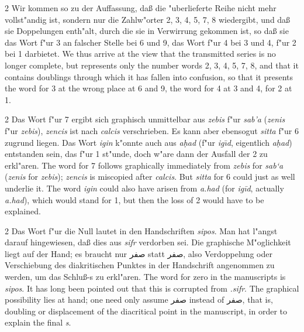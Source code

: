 \documentclass[10pt,a4paper]{article}
\renewcommand{\switchcolumn}{\syncronize\nointerlineskip\columnbreak}
\newcommand{\RL}[1]{\beginR#1\endR}
\newcommand{\ar}[1]{{\arabicfont\RL{#1}}}
\begin{document}
\begin{paracol}{2}
Wir kommen so zu der Auffassung, da\ss{} die "uberlieferte Reihe nicht mehr vollst"andig ist, sondern nur die Zahlw"orter 2, 3, 4, 5, 7, 8 wiedergibt, und da\ss{} sie Doppelungen enth"alt, durch die sie in Verwirrung gekommen ist, so da\ss{} sie das Wort f"ur 3 an falscher Stelle bei 6 und 9, das Wort f"ur 4 bei 3 und 4, f"ur 2 bei 1 darbietet.
\switchcolumn
We thus arrive at the view that the transmitted series is no longer complete, but represents only the number words 2, 3, 4, 5, 7, 8, and that it contains doublings through which it has fallen into confusion, so that it presents the word for 3 at the wrong place at 6 and 9, the word for 4 at 3 and 4, for 2 at 1.
\end{paracol}

\begin{paracol}{2}
Das Wort f"ur 7 ergibt sich graphisch unmittelbar aus \textit{zebis} f"ur \textit{sab'a} (\textit{zenis} f"ur \textit{zebis}), \textit{zencis} ist nach \textit{calcis} verschrieben. Es kann aber ebensogut \textit{sitta} f"ur 6 zugrund liegen. Das Wort \textit{igin} k"onnte auch aus \textit{a\d{h}ad} (f"ur \textit{ig\=ıd}, eigentlich \textit{a\d{h}ad}) entstanden sein, das f"ur 1 st"unde, doch w"are dann der Ausfall der 2 zu erkl"aren.
\switchcolumn
The word for 7 follows graphically immediately from \textit{zebis} for \textit{sab`a} (\textit{zenis} for \textit{zebis}); \textit{zencis} is miscopied after \textit{calcis}. But \textit{sitta} for 6 could just as well underlie it. The word \textit{igin} could also have arisen from \textit{a.had} (for \textit{ig\={i}d}, actually \textit{a.had}), which would stand for 1, but then the loss of 2 would have to be explained.
\end{paracol}

\begin{paracol}{2}
Das Wort f"ur die Null lautet in den Handschriften \textit{sipos}. Man hat l"angst darauf hingewiesen, da\ss{} dies aus \textit{sifr} verdorben sei. Die graphische M"oglichkeit liegt auf der Hand; es braucht nur \ar{صفر} statt \ar{صفر}, also Verdoppelung oder Verschiebung des diakritischen Punktes in der Handschrift angenommen zu werden, um das Schlu\ss{}-s zu erkl"aren.
\switchcolumn
The word for zero in the manuscripts is \textit{sipos}. It has long been pointed out that this is corrupted from \textit{.sifr}. The graphical possibility lies at hand; one need only assume \ar{صفر} instead of \ar{صفر}, that is, doubling or displacement of the diacritical point in the manuscript, in order to explain the final \textit{s}.
\end{paracol}
\end{document}
